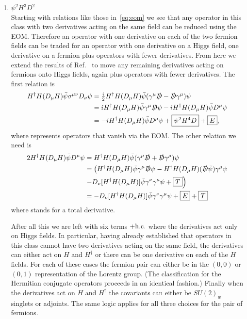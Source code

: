 \begin{enumerate}
\item $\psi^2H^3D^2$ \\
Starting with relations like those in~\eqref{eq:eom} we see that any operator in this class with two derivatives acting on the same field can be reduced using the EOM.
Therefore an operator with one derivative on each of the two fermion fields can be traded for an operator with one derivative on a Higgs field, one derivative on a fermion plus operators with fewer derivatives.
From here we extend the results of Ref.~\cite{Grzadkowski:2010es} to move any remaining derivatives acting on fermions onto Higgs fields, again plus operators with fewer derivatives.
The first relation is
\begin{align}
\label{eq:ten}
H^\dag H (D_\mu H) \bar \psi \sigma^{\mu\nu} D_\nu \psi &= \tfrac{i}{2} H^\dag H (D_\mu H) \bar \psi (\gamma^\mu \slashed D - \slashed D \gamma^\mu) \psi \nonumber\\ 
&= i H^\dag H (D_\mu H) \bar \psi \gamma^\mu \slashed D \psi - i H^\dag H (D_\mu H) \bar \psi D^\mu \psi \nonumber\\ 
&= - i H^\dag H (D_\mu H) \bar \psi D^\mu \psi + \fbox{$\psi^2H^4D$} + \fbox{$E$} ,
\end{align}
where  represents operators that vanish via the EOM.
The other relation we need is
\begin{align}
2 H^\dag H (D_\mu H) \bar \psi D^\mu \psi &= H^\dag H (D_\mu H) \bar \psi (\gamma^\mu \slashed D + \slashed D \gamma^\mu) \psi \nonumber\\ 
&= \left(H^\dag H (D_\mu H) \bar \psi \gamma^\mu \slashed D \psi - H^\dag H (D_\mu H) (\slashed D \bar \psi) \gamma^\mu \psi \right. \nonumber\\ 
&\left. - D_\nu [H^\dag H (D_\mu H)] \bar \psi \gamma^\nu \gamma^\mu \psi + \fbox{$T$}\right) \nonumber\\ 
&= - D_\nu [H^\dag H (D_\mu H)] \bar \psi \gamma^\nu \gamma^\mu \psi + \fbox{$E$} + \fbox{$T$}
\end{align}
where  stands for a total derivative.

After all this we are left with six terms $+ \mathrm{h.c.}$ where the derivatives act only on Higgs fields.
In particular, having already established that operators in this class cannot have two derivatives acting on the same field, the derivatives can either act on $H$ and $H^\dag$ or there can be one derivative on each of the $H$ fields.
For each of these cases the fermion pair can either be in the $(0, 0)$ or $(0, 1)$ representation of the Lorentz group.
(The classification for the Hermitian conjugate operators proceeds in an identical fashion.)
Finally when the derivatives act on $H$ and $H^\dag$ the covariants can either be $SU(2)_w$ singlets or adjoints.
The same logic applies for all three choices for the pair of fermions.


\end{enumerate}
